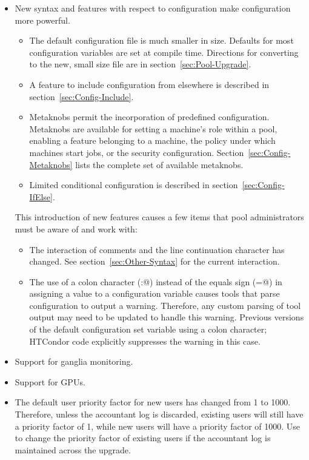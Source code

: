 \begin{itemize}

\item New syntax and features with respect to configuration
make configuration more powerful.
  \begin{itemize}
  \item The default configuration file is much smaller in size.
   Defaults for most configuration variables are set at compile time.
   Directions for converting to the new, small size file are in
   section~\ref{sec:Pool-Upgrade}.
  \item A feature to include configuration from elsewhere
   is described in section~\ref{sec:Config-Include}.
  \item Metaknobs permit the incorporation of predefined configuration.
   Metaknobs are available for setting a machine's role within
   a pool, enabling a feature belonging to a machine, the policy under which
   machines start jobs, or the security configuration.
   Section~\ref{sec:Config-Metaknobs} lists the complete set of available
   metaknobs.
  \item Limited conditional configuration is described in 
   section~\ref{sec:Config-IfElse}.
  \end{itemize}
This introduction of new features causes a few items that pool
administrators must be aware of and work with:
  \begin{itemize}
  \item The interaction of comments and the line continuation character
   has changed.  See  section~\ref{sec:Other-Syntax} for the current
   interaction. 
  \item The use of a colon character (\verb@:@) instead of the
   equals sign (\verb@=@) in assigning a value to a configuration variable
   causes tools that parse configuration to output a warning.
   Therefore, any custom parsing of tool output may need to be updated to
   handle this warning.
   Previous versions of the default configuration set variable
    using a colon character;
   HTCondor code explicitly suppresses the warning in this case.
  \end{itemize}

\item Support for ganglia monitoring.

\item Support for GPUs.

\item The default user priority factor for new users has changed 
from 1 to 1000.
Therefore, unless the accountant log is discarded,
existing users will still have a priority factor of 1,
while new users will have a priority factor of 1000.
Use  to change the priority factor of existing users
if the accountant log is maintained across the upgrade. 


\end{itemize}

